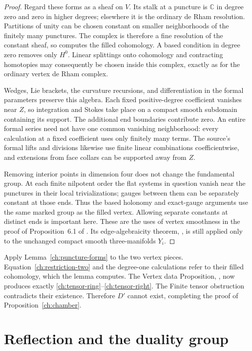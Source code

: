 \documentclass[11pt]{article}
\theoremstyle{definition}
\theoremstyle{remark}
\begin{document}
\begin{proof}
Regard these forms as a sheaf on $V$.  Its stalk at a puncture is
$\mathbb C$ in degree zero and zero in higher degrees; elsewhere
it is the ordinary de Rham resolution.  Partitions of unity can
be chosen constant on smaller neighborhoods of the finitely many
punctures.  The complex is therefore a fine resolution of the
constant sheaf, so computes the filled cohomology.  A based condition
in degree zero removes only $H^0$.  Linear splittings onto cohomology
and contracting homotopies may consequently be chosen inside this
complex, exactly as for the ordinary vertex de Rham complex.

Wedges, Lie brackets, the curvature recursions, and differentiation
in the formal parameters preserve this algebra.  Each fixed
positive-degree coefficient vanishes near $Z$, so integration and
Stokes take place on a compact smooth subdomain containing its
support.  The additional end boundaries contribute zero.  An entire
formal series need not have one common vanishing neighborhood:
every calculation at a fixed coefficient uses only finitely many
terms.  The source's formal lifts and divisions likewise use
finite linear combinations coefficientwise, and extensions from
face collars can be supported away from $Z$.

Removing interior points in dimension four does not change the
fundamental group.  At each finite nilpotent order the flat systems
in question vanish near the punctures in their local trivializations;
gauges between them can be separately constant at those ends.
Thus the based holonomy and exact-gauge arguments use the same
marked group as the filled vertex.  Allowing separate constants
at distinct ends is important here.  These are the uses of vertex
smoothness in the proof of Proposition~6.1 of \cite{TO}.
Its edge-algebraicity theorem, \cite[Theorem~5.1]{TO},
is still applied only to the unchanged compact smooth
three-manifolds $Y_i$.
\end{proof}

Apply Lemma~\ref{ch:puncture-forms} to the two vertex pieces.
Equation~\eqref{ch:restriction-two} and the degree-one calculations
refer to their filled cohomology, which the lemma computes.  The
Vertex data Proposition, \cite[Proposition~6.1]{TO}, now produces exactly
\eqref{ch:tensor-ring}--\eqref{ch:tensor-right}.  The Finite tensor
obstruction contradicts their existence.  Therefore $D'$ cannot
exist, completing the proof of Proposition~\ref{ch:chamber}.

\section{Reflection and the duality group}
\label{rf:section}
\end{document}
